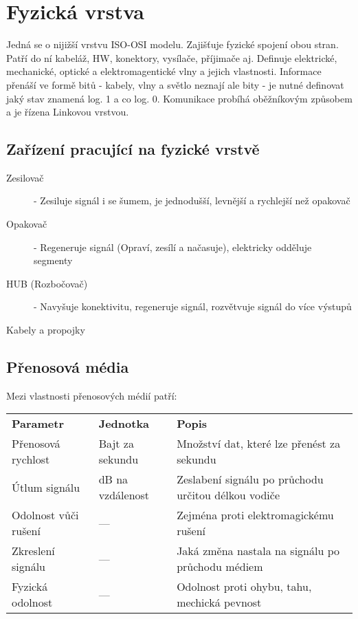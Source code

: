 \section{Fyzická vrstva}
\label{sec:fyzicka-vrstva}
Jedná se o nijižší vrstvu ISO-OSI modelu.
Zajišťuje fyzické spojení obou stran.
Patří do ní kabeláž, HW, konektory, vysílače, příjimače aj.
Definuje elektrické, mechanické, optické a elektromagentické vlny a jejich vlastnosti.
Informace přenáší ve formě bitů - kabely, vlny a světlo neznají ale bity - je nutné definovat jaký stav znamená log. 1 a co log. 0.
Komunikace probíhá oběžníkovým způsobem a je řízena Linkovou vrstvou.
\subsection{Zařízení pracující na fyzické vrstvě}
\begin{description}
  \item[Zesilovač]- Zesiluje signál i se šumem, je jednodušší, levnější a rychlejší než opakovač
  \item[Opakovač]- Regeneruje signál (Opraví, zesílí a načasuje), elektricky odděluje segmenty
  \item[HUB (Rozbočovač)]- Navyšuje konektivitu, regeneruje signál, rozvětvuje signál do více výstupů
  \item[Kabely a propojky] 
\end{description}
\subsection{Přenosová média}
Mezi vlastnosti přenosových médií patří:\\
\begin{tabularx}{\linewidth}{l|l|l}
  \textbf{Parametr}    & \textbf{Jednotka} & \textbf{Popis}                                      \\
  Přenosová rychlost   & Bajt za sekundu   & Množství dat, které lze přenést za sekundu          \\
  \hline
  Útlum signálu        & dB na vzdálenost  & Zeslabení signálu po průchodu určitou délkou vodiče \\
  \hline
  Odolnost vůči rušení & ---               & Zejména proti elektromagickému rušení               \\
  \hline
  Zkreslení signálu    & ---               & Jaká změna nastala na signálu po průchodu médiem    \\
  \hline
  Fyzická odolnost     & ---               & Odolnost proti ohybu, tahu, mechická pevnost        \\
\end{tabularx}
